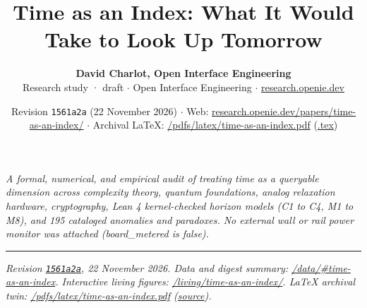 \documentclass[10pt,letterpaper]{article}
\title{\vspace{-1.2em}\textbf{Time as an Index: What It Would Take to Look Up Tomorrow}}
\author{\textbf{David Charlot, Open Interface Engineering}\\[0.15em]
{\small Research study · draft $\cdot$ Open Interface Engineering $\cdot$ \href{https://research.openie.dev}{research.openie.dev}}}
\date{\small Revision \texttt{1561a2a} (22 November 2026) $\cdot$ Web: \href{https://research.openie.dev/papers/time-as-an-index/}{research.openie.dev/papers/time-as-an-index/} $\cdot$ Archival LaTeX: \href{https://research.openie.dev/pdfs/latex/time-as-an-index.pdf}{/pdfs/latex/time-as-an-index.pdf} (\href{https://research.openie.dev/pdfs/latex/time-as-an-index.tex}{.tex})}
\begin{document}
\maketitle
\vspace{-0.6em}

\noindent{}

\vspace{6pt}
\hspace{8pt}%
\parbox{\dimexpr\linewidth-11pt\relax}{%
  \small\itshape\color{openieSlate}%
  A formal, numerical, and empirical audit of treating time as a queryable dimension across complexity theory, quantum foundations, analog relaxation hardware, cryptography, Lean 4 kernel-checked horizon models (C1 to C4, M1 to M8), and 195 cataloged anomalies and paradoxes. No external wall or rail power monitor was attached (board\_metered is false).
}
\vspace{6pt}

{
\small
\setcounter{tocdepth}{2}
\tableofcontents
}
\vspace{4pt}
\hrule
\vspace{8pt}

\emph{Revision
\href{https://github.com/openIE-dev/research-openie-web/commits/main/src/content/papers/time-as-an-index.md}{\texttt{1561a2a}},
22 November 2026. Data and digest summary:
\href{https://research.openie.dev/data/\#time-as-an-index}{/data/\#time-as-an-index}.
Interactive living figures:
\href{https://research.openie.dev/living/time-as-an-index/}{/living/time-as-an-index/}.
LaTeX archival twin:
\href{https://research.openie.dev/pdfs/latex/time-as-an-index.pdf}{/pdfs/latex/time-as-an-index.pdf}
(\href{https://research.openie.dev/pdfs/latex/time-as-an-index.tex}{source}).}
\end{document}
